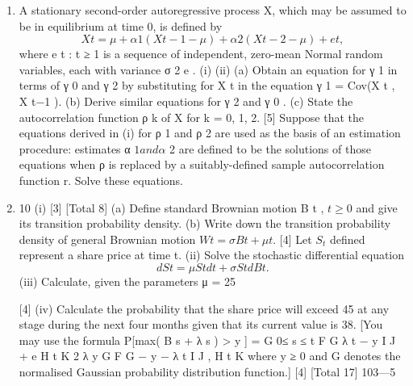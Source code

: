 \documentclass[a4paper,12pt]{article}
\begin{document}

\begin{enumerate}
\item 
A stationary second-order autoregressive process X, which may be assumed to
be in equilibrium at time 0, is defined by
\[X t = μ + α 1 (X t−1 − μ) + α 2 (X t−2 − μ) + e t ,\]
where {e t : t ≥ 1} is a sequence of independent, zero-mean Normal random
variables, each with variance σ 2 e .
(i)
(ii)
(a) Obtain an equation for γ 1 in terms of γ 0 and γ 2 by substituting for X t in the equation γ 1 = Cov(X t , X t−1 ).
(b) Derive similar equations for γ 2 and γ 0 .
(c) State the autocorrelation function ρ k of X for k = 0, 1, 2.
[5]
Suppose that the equations derived in (i) for ρ 1 and ρ 2 are used as the basis of an estimation procedure: estimates α $ 1 and α $ 2 are defined to be the solutions of those equations when ρ is replaced by a suitably-defined sample autocorrelation function r.
Solve these equations.
\item 
10
(i)
[3]
[Total 8]
(a) Define standard Brownian motion B t , $t \geq 0$ and give its transition
probability density.
(b) Write down the transition probability density of general
Brownian motion $W t = \sigma B t + μt$.
[4]
Let $S_t$ defined represent a share price at time t.
(ii)
Solve the stochastic differential equation
\[dS t = μS t dt + σS t dB t .\]
(iii) Calculate, given the parameters μ = 25%

[4]
(iv) Calculate the probability that the share price will exceed 45 at any stage during the next four months given that its current value is 38.
[You may use the formula
P[max( B s + λ s ) > y ] = G
0≤ s ≤ t
F G λ t − y I J + e
H t K
2 λ y
G
F G − y − λ t I J ,
H t K
where y ≥ 0 and G denotes the normalised Gaussian probability
distribution function.]
[4]
[Total 17]
103—5



\end{enumerate}
\end{document}
